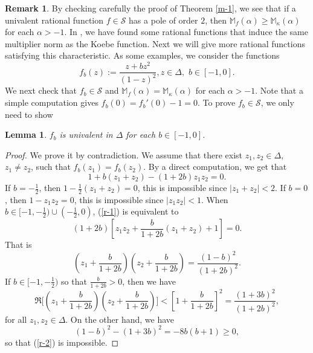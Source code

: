 \documentclass[10pt]{amsart}
\newtheorem{lemma}[theorem]{Lemma}
\theoremstyle{definition}    %
\newtheorem{remark}[theorem]{Remark}
\numberwithin{equation}{section}
\begin{document}
\begin{remark}
By checking carefully the proof of Theorem \ref{m-1}, we see that if a univalent rational function $f\in \mathcal{S}$ has a pole of order $2$, then $\mathbb{M}_f(\alpha)\geq \mathbb{M}_{\kappa}(\alpha)$ for each $\alpha>-1$. 
In \cite{Jin-c}, we have found some rational functions that induce the same multiplier norm as the Koebe function.
Next we will give more rational functions satisfying this characteristic. As some examples, we consider the functions $$f_b(z):=\frac{z+bz^2}{(1-z)^2},z\in \Delta,\,\, b\in [-1,0].$$ We next check that $f_b\in \mathcal{S}$ and $\mathbb{M}_f(\alpha)=\mathbb{M}_{\kappa}(\alpha)$ for each $\alpha>-1$.
Note that a simple computation gives $f_b(0)=f_b'(0)-1=0$. To prove $f_b\in \mathcal{S}$, we only need to show 
\begin{lemma}\label{ll-5}$f_b$ is univalent in $\Delta$ for each $b\in [-1,0]$.
\end{lemma}
\begin{proof}We prove it by contradiction. We assume that there exist $z_1,z_2\in\Delta$, $z_1\neq z_2$, such that $f_b(z_1)=f_b(z_2)$.
By a direct computation, we get that 
\begin{equation}\label{r-1}1+b(z_1+z_2)-(1+2b)z_1z_2=0.\end{equation}
If $b=-\frac{1}{2}$, then $1-\frac{1}{2}(z_1+z_2)=0$, this is impossible since $|z_1+z_2|<2.$ If $b=0$, then $1-z_1z_2=0$, this is impossible since $|z_1z_2|<1.$
When $b\in [-1,-\frac{1}{2})\cup (-\frac{1}{2},0)$, (\ref{r-1}) is equivalent to 
\begin{equation}(1+2b)[z_1z_2+\frac{b}{1+2b}(z_1+z_2)+1]=0.\nonumber\end{equation}
That is 
\begin{equation}\label{r-2}(z_1+\frac{b}{1+2b})(z_2+\frac{b}{1+2b})=\frac{(1-b)^2}{(1+2b)^2}.\end{equation}
If $b\in [-1,-\frac{1}{2})$ so that $\frac{b}{1+2b}>0$, then we have  
$$\Re{\Big[(z_1+\frac{b}{1+2b})(z_2+\frac{b}{1+2b})\Big]}<[1+\frac{b}{1+2b}]^2=\frac{(1+3b)^2}{(1+2b)^2},$$
for all $z_1,z_2 \in\Delta$. On the other hand, we have
$$(1-b)^2-(1+3b)^2=-8b(b+1)\geq 0,$$
so that (\ref{r-2}) is impossible. 


\end{proof}
\end{remark}
\end{document}
